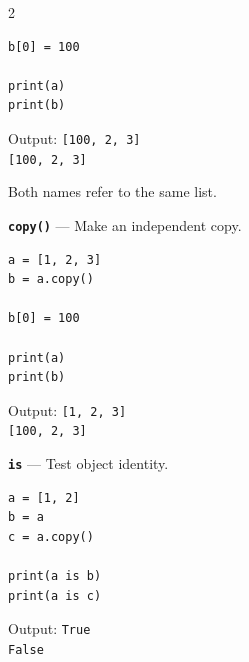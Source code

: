 \documentclass[10pt,a4paper]{article}
\begin{document}
\begin{multicols}{2}
\begin{card}
\begin{lstlisting}[style=pythonstyle]
b[0] = 100

print(a)
print(b)
\end{lstlisting}

Output:
\texttt{[100, 2, 3]}\\
\texttt{[100, 2, 3]}

Both names refer to the same list.
\end{card}

\begin{card}
\textbf{\texttt{copy()}} --- Make an independent copy.

\begin{lstlisting}[style=pythonstyle]
a = [1, 2, 3]
b = a.copy()

b[0] = 100

print(a)
print(b)
\end{lstlisting}

Output:
\texttt{[1, 2, 3]}\\
\texttt{[100, 2, 3]}
\end{card}

\begin{card}
\textbf{\texttt{is}} --- Test object identity.

\begin{lstlisting}[style=pythonstyle]
a = [1, 2]
b = a
c = a.copy()

print(a is b)
print(a is c)
\end{lstlisting}

Output:
\texttt{True}\\
\texttt{False}
\end{card}


\end{multicols}

\newpage
\end{document}

